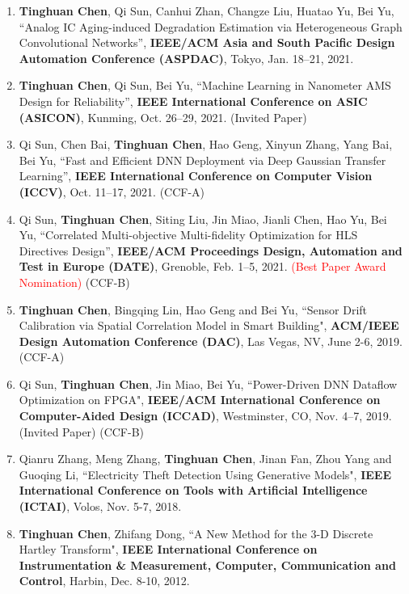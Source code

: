 \documentclass[letterpaper,11pt]{article}%
\begin{document}
\begin{enumerate}[(1)]


\item \textbf{Tinghuan Chen}, Qi Sun, Canhui Zhan, Changze Liu, Huatao Yu, Bei Yu, ``Analog IC Aging-induced Degradation Estimation via Heterogeneous Graph Convolutional Networks'', \textbf{IEEE/ACM Asia and South Pacific Design Automation Conference (ASPDAC)}, Tokyo, Jan. 18–21, 2021. 

\item \textbf{Tinghuan Chen}, Qi Sun, Bei Yu, ``Machine Learning in Nanometer AMS Design for Reliability'', \textbf{IEEE International Conference on ASIC (ASICON)}, Kunming, Oct. 26–29, 2021. (Invited Paper)

\item Qi Sun, Chen Bai, \textbf{Tinghuan Chen}, Hao Geng, Xinyun Zhang, Yang Bai, Bei Yu, ``Fast and Efficient DNN Deployment via Deep Gaussian Transfer Learning'', \textbf{IEEE International Conference on Computer Vision (ICCV)}, Oct. 11–17, 2021. (CCF-A)

\item Qi Sun, \textbf{Tinghuan Chen}, Siting Liu, Jin Miao, Jianli Chen, Hao Yu, Bei Yu, ``Correlated Multi-objective Multi-fidelity Optimization for HLS Directives Design'', \textbf{IEEE/ACM Proceedings Design, Automation and Test in Europe (DATE)}, Grenoble, Feb. 1–5, 2021. \textcolor{red}{(Best Paper Award Nomination)} (CCF-B)


\item \textbf{Tinghuan Chen}, Bingqing Lin, Hao Geng and Bei Yu, ``Sensor Drift Calibration via Spatial Correlation Model in Smart Building", \textbf{ACM/IEEE Design Automation Conference (DAC)}, Las Vegas, NV, June 2-6, 2019. (CCF-A)

\item Qi Sun, \textbf{Tinghuan Chen}, Jin Miao, Bei Yu, ``Power-Driven DNN Dataflow Optimization on FPGA", \textbf{IEEE/ACM International Conference on Computer-Aided Design (ICCAD)}, Westminster, CO, Nov. 4–7, 2019. (Invited Paper) (CCF-B)


\item Qianru Zhang, Meng Zhang, \textbf{Tinghuan Chen}, Jinan Fan, Zhou Yang and Guoqing Li, ``Electricity Theft Detection Using Generative Models", \textbf{IEEE International Conference on Tools with Artificial Intelligence (ICTAI)}, Volos, Nov. 5-7, 2018.


\item \textbf{Tinghuan Chen}, Zhifang Dong, ``A New Method for the 3-D Discrete Hartley Transform", \textbf{IEEE International Conference on Instrumentation \& Measurement, Computer, Communication and Control}, Harbin, Dec. 8-10, 2012.

\end{enumerate}
\end{document}
